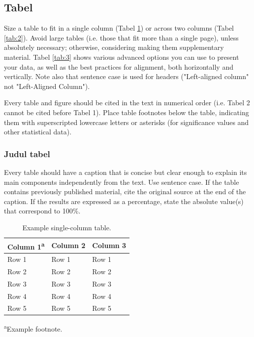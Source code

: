 \documentclass[twocolumn,twoside]{base/jrekpros}
\begin{document}
\subsection{Tabel}

Size a table to fit in a single column (Tabel \ref{tab:1}) or across two columns (Tabel \ref{tab:2}). Avoid large tables (i.e. those that fit more than a single page), unless absolutely necessary; otherwise, considering making them supplementary material. Tabel \ref{tab:3} shows various advanced options you can use to present your data, as well as the best practices for alignment, both horizontally and vertically. Note also that sentence case is used for headers ("Left-aligned column" not "Left-Aligned Column").

Every table and figure should be cited in the text in numerical order (i.e. Tabel 2 cannot be cited before Tabel 1). Place table footnotes below the table, indicating them with superscripted lowercase letters or asterisks (for significance values and other statistical data).

\subsubsection{Judul tabel}

Every table should have a caption that is concise but clear enough to explain its main components independently from the text. Use sentence case. If the table contains previously published material, cite the original source at the end of the caption. If the results are expressed as a percentage, state the absolute value(s) that correspond to 100\%.

\begin{table}[b]
  	\centering\footnotesize\sffamily
  	\caption{Example single-column table.}
  	\begin{tableminipage}{\linewidth}
    	\begin{tabularx} {\linewidth}{XXX}
			\toprule
            Column 1\textsuperscript{a} & Column 2 & Column 3  \\            
	    	\midrule
            Row 1 & Row 1 & Row 1 \\
            Row 2 & Row 2 & Row 2 \\
            Row 3 & Row 3 & Row 3 \\
            Row 4 & Row 4 & Row 4 \\
            Row 5 & Row 5 & Row 5 \\
            \bottomrule
    	\end{tabularx}
        \label{tab:1}
        \vskip0pt
        \textsuperscript{a}Example footnote.
  	\end{tableminipage}
\end{table}
\end{document}

